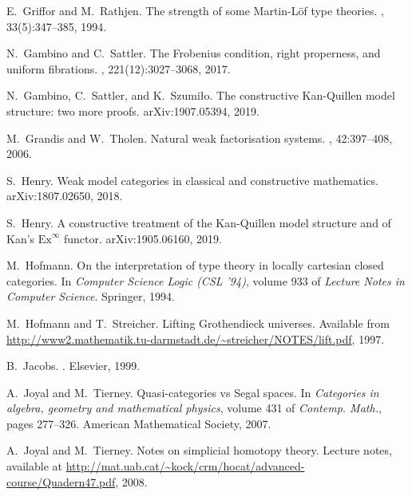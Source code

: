 \documentclass[reqno,10pt,a4paper,oneside]{amsart}
\numberwithin{equation}{section}
\theoremstyle{mythm}
\theoremstyle{mydef}
\theoremstyle{myrmk}
\begin{document}
\begin{thebibliography}{{}dBM15}
E.~Griffor and M.~Rathjen.
\newblock The strength of some {M}artin-{L}\"of type theories.
, 33(5):347--385, 1994.

N.~Gambino and C.~Sattler.
\newblock The {F}robenius condition, right properness, and uniform fibrations.
, 221(12):3027--3068, 2017.

N.~Gambino, C.~Sattler, and K.~Szumi{\l}o.
\newblock The constructive {K}an-{Q}uillen model structure: two more proofs.
\newblock arXiv:1907.05394, 2019.

M.~Grandis and W.~Tholen.
\newblock Natural weak factorisation systems.
, 42:397--408, 2006.

S.~Henry.
\newblock Weak model categories in classical and constructive mathematics.
\newblock arXiv:1807.02650, 2018.

S.~Henry.
\newblock A constructive treatment of the {K}an-{Q}uillen model structure and
  of {K}an's $\mathrm{Ex}^\infty$ functor.
\newblock arXiv:1905.06160, 2019.

M.~Hofmann.
\newblock On the interpretation of type theory in locally cartesian closed
  categories.
\newblock In {\em Computer Science Logic (CSL '94)}, volume 933 of {\em Lecture
  Notes in Computer Science}. Springer, 1994.

M.~Hofmann and T.~Streicher.
\newblock Lifting {G}rothendieck universes.
\newblock Available from \url{http://www2.mathematik.tu-darmstadt.de/~streicher/NOTES/lift.pdf}, 1997.

B.~Jacobs.
.
\newblock Elsevier, 1999.

A.~Joyal and M.~Tierney.
\newblock Quasi-categories vs {S}egal spaces.
\newblock In {\em Categories in algebra, geometry and mathematical physics},
  volume 431 of {\em Contemp. Math.}, pages 277--326. American Mathematical
  Society, 2007.

A.~Joyal and M.~Tierney.
\newblock Notes on simplicial homotopy theory.
\newblock Lecture notes, available at
  \url{http://mat.uab.cat/~kock/crm/hocat/advanced-course/Quadern47.pdf}, 2008.


\end{thebibliography}
\end{document}
